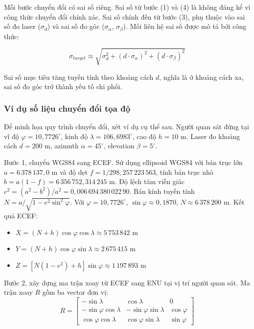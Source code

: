 Mỗi bước chuyển đổi có sai số riêng. Sai số từ bước (1) và (4) là không đáng kể vì công thức chuyển đổi chính xác. Sai số chính đến từ bước (3), phụ thuộc vào sai số đo laser ($\sigma_d$) và sai số đo góc ($\sigma_\alpha$, $\sigma_\beta$). Mối liên hệ sai số được mô tả bởi công thức:

\begin{equation}
\sigma_{target} \approx \sqrt{\sigma_d^2 + (d \cdot \sigma_\alpha)^2 + (d \cdot \sigma_\beta)^2}
\end{equation}

Sai số mục tiêu tăng tuyến tính theo khoảng cách $d$, nghĩa là ở khoảng cách xa, sai số đo góc trở thành yếu tố chi phối.

\subsubsection{Ví dụ số liệu chuyển đổi tọa độ}

\hspace{0.5cm} Để minh họa quy trình chuyển đổi, xét ví dụ cụ thể sau. Người quan sát đứng tại vĩ độ $\varphi = 10{,}7726^\circ$, kinh độ $\lambda = 106{,}6983^\circ$, cao độ $h = 10$ m. Laser đo khoảng cách $d = 200$ m, azimuth $\alpha = 45^\circ$, elevation $\beta = 5^\circ$.

Bước 1, chuyển WGS84 sang ECEF. Sử dụng ellipsoid WGS84 với bán trục lớn $a = 6\,378\,137{,}0$ m và độ dẹt $f = 1/298{,}257\,223\,563$, tính bán trục nhỏ $b = a(1-f) = 6\,356\,752{,}314\,245$ m. Độ lệch tâm viễn giác $e^2 = (a^2 - b^2)/a^2 = 0{,}006\,694\,380\,022\,90$. Bán kính tuyến tính $N = a/\sqrt{1 - e^2 \sin^2\varphi}$. Với $\varphi = 10{,}7726^\circ$, $\sin\varphi \approx 0{,}1870$, $N \approx 6\,378\,200$ m. Kết quả ECEF:
\begin{itemize}
    \item $X = (N + h)\cos\varphi\cos\lambda \approx 5\,753\,842$ m
    \item $Y = (N + h)\cos\varphi\sin\lambda \approx 2\,675\,415$ m
    \item $Z = [N(1-e^2) + h]\sin\varphi \approx 1\,197\,893$ m
\end{itemize}

Bước 2, xây dựng ma trận xoay từ ECEF sang ENU tại vị trí người quan sát. Ma trận xoay $R$ gồm ba vector đơn vị:
\begin{equation}
R = \begin{bmatrix} -\sin\lambda & \cos\lambda & 0 \\ -\sin\varphi\cos\lambda & -\sin\varphi\sin\lambda & \cos\varphi \\ \cos\varphi\cos\lambda & \cos\varphi\sin\lambda & \sin\varphi \end{bmatrix}
\end{equation}

